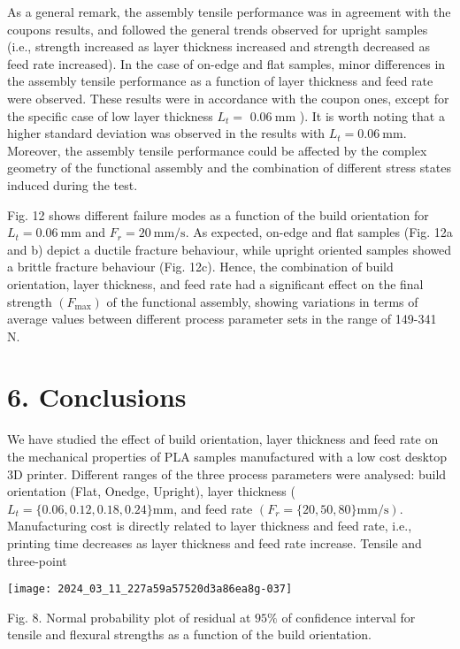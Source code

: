 \documentclass[10pt]{article}
\begin{document}
As a general remark, the assembly tensile performance was in agreement with the coupons results, and followed the general trends observed for upright samples (i.e., strength increased as layer thickness increased and strength decreased as feed rate increased). In the case of on-edge and flat samples, minor differences in the assembly tensile performance as a function of layer thickness and feed rate were observed. These results were in accordance with the coupon ones, except for the specific case of low layer thickness $L_{t}=$ $0.06 \mathrm{~mm}$ ). It is worth noting that a higher standard deviation was observed in the results with $L_{t}=0.06 \mathrm{~mm}$. Moreover, the assembly tensile performance could be affected by the complex geometry of the functional assembly and the combination of different stress states induced during the test.

Fig. 12 shows different failure modes as a function of the build orientation for $L_{t}=0.06 \mathrm{~mm}$ and $F_{r}=20 \mathrm{~mm} / \mathrm{s}$. As expected, on-edge and flat samples (Fig. 12a and b) depict a ductile fracture behaviour, while upright oriented samples showed a brittle fracture behaviour (Fig. 12c). Hence, the combination of build orientation, layer thickness, and feed rate had a significant effect on the final strength $\left(F_{\max }\right)$ of the functional assembly, showing variations in terms of average values between different process parameter sets in the range of 149-341 N.

\section*{6. Conclusions}
We have studied the effect of build orientation, layer thickness and feed rate on the mechanical properties of PLA samples manufactured with a low cost desktop 3D printer. Different ranges of the three process parameters were analysed: build orientation (Flat, Onedge, Upright), layer thickness ( $L_{t}=\{0.06,0.12,0.18,0.24\} \mathrm{mm}$, and feed rate $\left(F_{r}=\{20,50,80\} \mathrm{mm} / \mathrm{s}\right)$. Manufacturing cost is directly related to layer thickness and feed rate, i.e., printing time decreases as layer thickness and feed rate increase. Tensile and three-point

\begin{center}
\texttt{[image: 2024\_03\_11\_227a59a57520d3a86ea8g-037]}
\end{center}

Fig. 8. Normal probability plot of residual at $95 \%$ of confidence interval for tensile and flexural strengths as a function of the build orientation.
\end{document}
